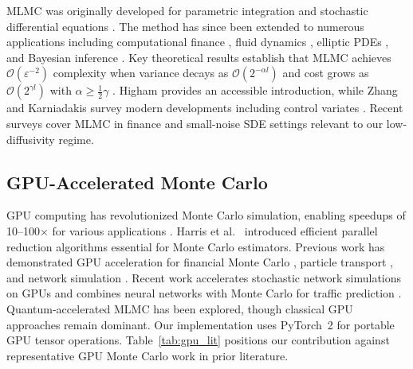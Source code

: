 \documentclass{ieeeaccess}
\begin{document}
MLMC was originally developed for parametric integration \cite{heinrich2001multilevel} and
stochastic differential equations \cite{giles2008multilevel}. The method has since been extended
to numerous applications including computational finance \cite{giles2012finance, glasserman2003monte},
fluid dynamics \cite{mishra2012sparse}, elliptic PDEs \cite{cliffe2015}, and Bayesian inference
\cite{dodwell2015hierarchical}. Key theoretical results establish that MLMC achieves
$\mathcal{O}(\varepsilon^{-2})$ complexity when variance decays as $\mathcal{O}(2^{-\alpha l})$
and cost grows as $\mathcal{O}(2^{\gamma l})$ with $\alpha \geq \frac{1}{2}\gamma$
\cite{giles2015multilevel}. Higham \cite{higham2015} provides an accessible introduction, while
Zhang and Karniadakis \cite{zhang2020} survey modern developments including control variates
\cite{hickernell2005, lapeyre2003}. Recent surveys cover MLMC in finance \cite{giles2024review}
and small-noise SDE settings \cite{spiliopoulos2022multilevel} relevant to our low-diffusivity
regime.

\subsection{GPU-Accelerated Monte Carlo}

GPU computing has revolutionized Monte Carlo simulation, enabling speedups of 10--100$\times$
for various applications \cite{nvidia2020cuda, owens2008}. Harris et al.\ \cite{harris2007}
introduced efficient parallel reduction algorithms essential for Monte Carlo estimators. Previous
work has demonstrated GPU acceleration for financial Monte Carlo \cite{thompson2010gpu}, particle
transport \cite{bergmann2017gpu}, and network simulation \cite{perumalla2011discrete}. Recent work
accelerates stochastic network simulations on GPUs \cite{sha2023gpu} and combines neural networks
with Monte Carlo for traffic prediction \cite{chen2022neural}. Quantum-accelerated MLMC
\cite{an2021} has been explored, though classical GPU approaches remain dominant. Our
implementation uses PyTorch~2 \cite{pytorch2024} for portable GPU tensor operations.
Table~\ref{tab:gpu_lit} positions our contribution against representative GPU Monte Carlo work
in prior literature.
\end{document}
